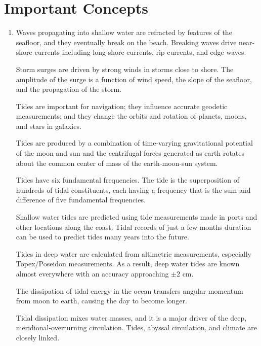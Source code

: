 \section{Important Concepts}
\begin{enumerate}
\item Waves propagating into shallow water are refracted by features of
the seafloor, and they eventually break on the beach. Breaking waves
drive near-shore currents including long-shore currents, rip
currents, and edge waves.

\vitem Storm surges are driven by strong winds in storms close to
shore. The amplitude of the surge is a function of wind speed, the
slope of the seafloor, and the propagation of the storm.

\vitem Tides are important for navigation; they influence accurate
geodetic measurements; and they change the orbits and rotation of
planets, moons, and stars in galaxies.

\vitem Tides are produced by a combination of time-varying
gravitational potential of the moon and sun and the centrifugal forces
generated as earth rotates about the common center of mass of the
earth-moon-sun system.

\vitem Tides have six fundamental frequencies. The tide is the
superposition of hundreds of tidal constituents, each having a
frequency that is the sum and difference of five fundamental
frequencies.

\vitem Shallow water tides are predicted using tide measurements made
in ports and other locations along the coast. Tidal records of just a
few months duration can be used to predict tides many years into the
future.

\vitem Tides in deep water are calculated from altimetric
measurements, especially Topex/Poseidon
measurements. As a result, deep water tides are known almost
everywhere with an accuracy approaching $\pm 2$
cm.

\vitem The dissipation of tidal energy in the ocean transfers angular
momentum from moon to earth, causing the day to become
longer.

\vitem Tidal dissipation mixes water masses, and it is a major driver
of the deep, meridional-overturning
circulation. Tides, abyssal
circulation, and climate are closely linked.
\end{enumerate}

